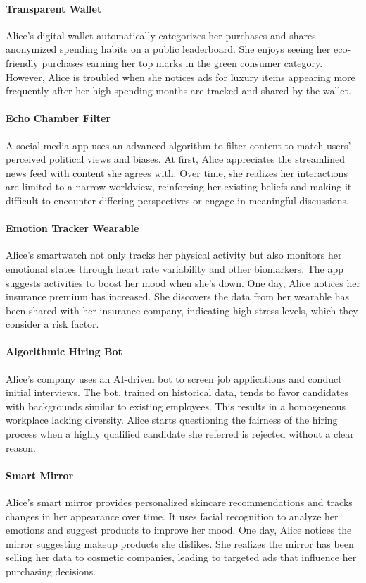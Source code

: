 \paragraph{Transparent Wallet}
Alice's digital wallet automatically categorizes her purchases and shares anonymized spending habits on a public leaderboard. She enjoys seeing her eco-friendly purchases earning her top marks in the green consumer category. However, Alice is troubled when she notices ads for luxury items appearing more frequently after her high spending months are tracked and shared by the wallet.

\paragraph{Echo Chamber Filter}
A social media app uses an advanced algorithm to filter content to match users' perceived political views and biases. At first, Alice appreciates the streamlined news feed with content she agrees with. Over time, she realizes her interactions are limited to a narrow worldview, reinforcing her existing beliefs and making it difficult to encounter differing perspectives or engage in meaningful discussions.

\paragraph{Emotion Tracker Wearable}
Alice’s smartwatch not only tracks her physical activity but also monitors her emotional states through heart rate variability and other biomarkers. The app suggests activities to boost her mood when she’s down. One day, Alice notices her insurance premium has increased. She discovers the data from her wearable has been shared with her insurance company, indicating high stress levels, which they consider a risk factor.

\paragraph{Algorithmic Hiring Bot}
Alice's company uses an AI-driven bot to screen job applications and conduct initial interviews. The bot, trained on historical data, tends to favor candidates with backgrounds similar to existing employees. This results in a homogeneous workplace lacking diversity. Alice starts questioning the fairness of the hiring process when a highly qualified candidate she referred is rejected without a clear reason.

\paragraph{Smart Mirror}
Alice's smart mirror provides personalized skincare recommendations and tracks changes in her appearance over time. It uses facial recognition to analyze her emotions and suggest products to improve her mood. One day, Alice notices the mirror suggesting makeup products she dislikes. She realizes the mirror has been selling her data to cosmetic companies, leading to targeted ads that influence her purchasing decisions.

